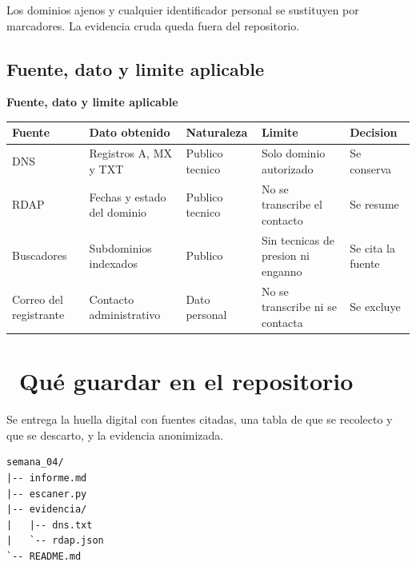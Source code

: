 \documentclass[11pt,a4paper]{article}
\newcommand{\iconotexto}[2]{\textcolor{cyanNeon}{\faIcon{#1}}~#2}
\begin{document}
Los dominios ajenos y cualquier identificador personal se sustituyen por marcadores. La evidencia cruda queda fuera del repositorio.

\subsection{Fuente, dato y limite aplicable}

\begin{center}
\begin{minipage}{\linewidth}
\centering
{\footnotesize
\textbf{Fuente, dato y limite aplicable}\par\smallskip
\begin{tabular}{@{}>{\raggedright\arraybackslash}p{2.40cm}>{\raggedright\arraybackslash}p{3.20cm}>{\raggedright\arraybackslash}p{2.20cm}>{\raggedright\arraybackslash}p{3.00cm}>{\raggedright\arraybackslash}p{3.00cm}@{}}
\toprule
\textbf{Fuente} & \textbf{Dato obtenido} & \textbf{Naturaleza} & \textbf{Limite} & \textbf{Decision} \\
\midrule
DNS & Registros A, MX y TXT & Publico tecnico & Solo dominio autorizado & Se conserva \\
RDAP & Fechas y estado del dominio & Publico tecnico & No se transcribe el contacto & Se resume \\
Buscadores & Subdominios indexados & Publico & Sin tecnicas de presion ni enganno & Se cita la fuente \\
Correo del registrante & Contacto administrativo & Dato personal & No se transcribe ni se contacta & Se excluye \\
\bottomrule
\end{tabular}
}
\par{}
\end{minipage}
\end{center}

\section{\iconotexto{box-open}{Qué guardar en el repositorio}}

Se entrega la huella digital con fuentes citadas, una tabla de que se recolecto y que se descarto, y la evidencia anonimizada.

\begin{lstlisting}[style=estiloCodigo]
semana_04/
|-- informe.md
|-- escaner.py
|-- evidencia/
|   |-- dns.txt
|   `-- rdap.json
`-- README.md
\end{lstlisting}
\end{document}
